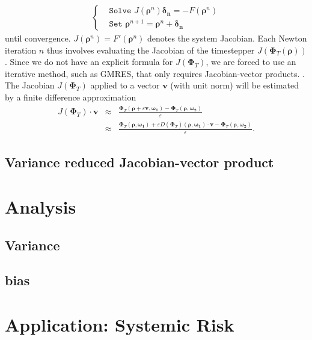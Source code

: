 \documentclass[]{article}
\newcommand{\U}{\ensuremath{\boldsymbol{\rho}}}
\newcommand{\cts}{\ensuremath{\boldsymbol{\Phi}_T}} %
\begin{document}
\begin{eqnarray}
\begin{cases}
& \texttt{Solve         }  J(\U^n) \boldsymbol{\delta_n}  =  - {F}(\U^n) \label{linear_system}        \\          
& \texttt{Set     } \U^{n+1} = \U^n+ \boldsymbol{\delta_n} 
\end{cases}
\end{eqnarray}
until convergence. 
$J(\U^n) =   F'(\U^n)  $ denotes the system Jacobian. Each Newton iteration $n$ thus involves evaluating the Jacobian of the timestepper $J(\cts(\U))$.
Since we do not have an explicit formula for $J(\cts)$, we are forced to use an iterative method, such as GMRES, that only requires Jacobian-vector products. %
 \cite{Brown_Krylov}.
The Jacobian $J(\cts)$ applied to a vector $\mathbf{v}$ (with unit norm) will be estimated by a finite difference approximation
\begin{eqnarray}
\label{Jv_approx}
J(\cts) \cdot \mathbf{v} &\approx& \frac{\cts (\U + \varepsilon \mathbf{v}, \boldsymbol{\omega_1} )  - \cts (\U, \boldsymbol{\omega_2})}{\varepsilon} \\
&\approx & \frac{\cts (\U, \boldsymbol{\omega_1} )  + \varepsilon D(\cts) (  \U, \boldsymbol{\omega_1})  \cdot \mathbf{v}  - \cts (\U, \boldsymbol{\omega_2}) }{\varepsilon} \nonumber
.
\end{eqnarray}

\subsection{Variance reduced Jacobian-vector product}

\section{Analysis}
\subsection{Variance}
\subsection{bias}


\section{Application: Systemic Risk}
\end{document}
